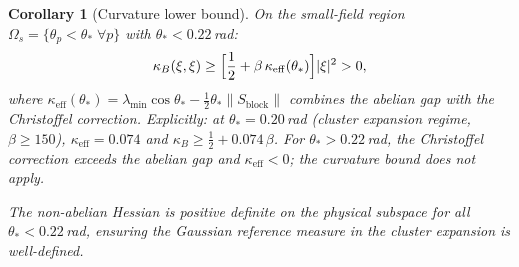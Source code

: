 \documentclass[11pt]{article}
\newtheorem{corollary}[theorem]{Corollary}
\theoremstyle{definition}
\begin{document}
\begin{corollary}[Curvature lower bound]\label{cor:curvature}
On the small-field region $\Omega_s=\{\theta_p<\theta_*\;\forall p\}$
with $\theta_*<0.22$\,rad:
\begin{equation}\label{eq:kappa}
\kappa_B(\xi,\xi)
\ge\Bigl[\frac{1}{2}+\beta\,\kappa_{\mathrm{eff}}(\theta_*)\Bigr]|\xi|^2
>0,
\end{equation}
where $\kappa_{\mathrm{eff}}(\theta_*)
=\lambda_{\min}\cos\theta_*-\tfrac{1}{2}\theta_*\|S_{\mathrm{block}}\|$
combines the abelian gap with the Christoffel correction.
Explicitly: at $\theta_*=0.20$\,rad (cluster expansion regime,
$\beta\ge 150$), $\kappa_{\mathrm{eff}}=0.074$
and $\kappa_B\ge\frac{1}{2}+0.074\,\beta$.
For $\theta_*>0.22$\,rad, the Christoffel correction exceeds the
abelian gap and $\kappa_{\mathrm{eff}}<0$; the curvature bound does
not apply.

The non-abelian Hessian is positive definite on the physical
subspace for all $\theta_*<0.22$\,rad, ensuring the Gaussian
reference measure in the cluster expansion is well-defined.
\end{corollary}
\end{document}
